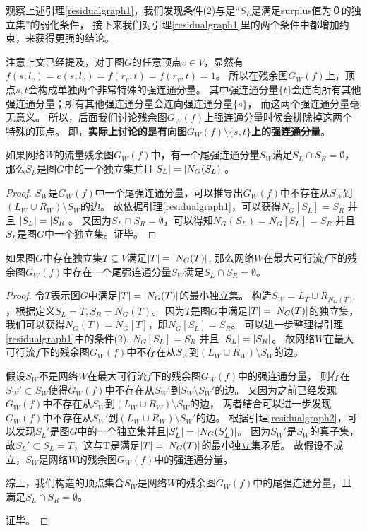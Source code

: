 观察上述引理\ref{residualgraph1}，我们发现条件(2)与是“$S_L$是满足surplus值为０的独立集”的弱化条件，
接下来我们对引理\ref{residualgraph1}里的两个条件中都增加约束，来获得更强的结论。

注意上文已经提及，对于图$G$的任意顶点$v \in V$，显然有$f(s, l_v) = c(s, l_v) = f(r_v, t) = f(r_v, t) = 1$。
所以在残余图$G_W(f)$上，顶点$s,t$会构成单独两个非常特殊的强连通分量。
其中强连通分量$\{t\}$会连向所有其他强连通分量；所有其他强连通分量会连向强连通分量$\{s\}$，
而这两个强连通分量毫无意义。
所以，后面我们讨论残余图$G_W(f)$上强连通分量时候会排除掉这两个特殊的顶点。
即，\textbf{实际上讨论的是有向图$G_W(f) \setminus \{s, t\}$上的强连通分量}。


\begin{lemma}  \label{residualgraph2}
如果网络$W$的流量残余图$G_W(f)$中，有一个尾强连通分量$S_W$满足$S_L \cap S_R = \emptyset$，
那么$S_L$是图$G$中的一个独立集并且$\left\vert S_L \right\vert = \left\vert N_G(S_L) \right\vert$。
\end{lemma}
\begin{proof}
$S_W$是$G_W(f)$中一个尾强连通分量，可以推导出$G_W(f)$中不存在从$S_W$到$(L_W \cup R_W) \setminus S_W$的边。
故依据引理\ref{residualgraph1}，可以获得$N_G[S_L] = S_R$ 并且 $\left\vert S_L \right\vert = \left\vert S_R \right\vert$。
又因为$S_L \cap S_R = \emptyset$，可以得知$N_G(S_L) = N_G[S_L] = S_R$ 并且 $S_L$是图$G$中一个独立集。证毕。
\end{proof}

\begin{lemma}  \label{residualgraph3}
如果图$G$中存在独立集$T \subseteq V$满足$\left\vert T \right\vert = \left\vert N_G(T) \right\vert$,
那么网络$W$在最大可行流$f$下的残余图$G_W(f)$中存在一个尾强连通分量$S_W$满足$S_L \cap S_R = \emptyset$。
\end{lemma}
\begin{proof}
令$T$表示图$G$中满足$\left\vert T \right\vert = \left\vert N_G(T) \right\vert$的最小独立集。
构造$S_W = L_T \cup R_{N_G(T)}$，根据定义$S_L = T, S_R = N_G(T)$。
因为$T$是图$G$中满足$\left\vert T \right\vert = \left\vert N_G(T) \right\vert$的独立集，
我们可以获得$N_G(T) = N_G[T]$，即$N_G[S_L] = S_R$。
可以进一步整理得引理\ref{residualgraph1}中的条件(2), $N_G[S_L] = S_R$ 并且 $\left\vert S_L \right\vert = \left\vert S_R \right\vert$。
故网络$W$在最大可行流$f$下的残余图$G_W(f)$中不存在从$S_W$到$(L_W \cup R_W) \setminus S_W$的边。

假设$S_W$不是网络$W$在最大可行流$f$下的残余图$G_W(f)$中的强连通分量，
则存在$S_W' \subset S_W$使得$G_W(f)$中不存在从$S_W'$到$S_W \setminus S_W'$的边。
又因为之前已经发现$G_W(f)$中不存在从$S_W$到$(L_W \cup R_W) \setminus S_W$的边，
两者结合可以进一步发现$G_W(f)$中不存在从$S_W'$到$(L_W \cup R_W) \setminus S_W'$的边。
根据引理\ref{residualgraph2}，可以发现$S_L'$是图$G$中的一个独立集并且$\left\vert S_L' \right\vert = \left\vert N_G(S_L') \right\vert$。
因为$S_W'$是$S_W$的真子集，故$S_L' \subset S_L = T$，这与T是满足$\left\vert T \right\vert = \left\vert N_G(T) \right\vert$的最小独立集矛盾。
故假设不成立，$S_W$是网络$W$的残余图$G_W(f)$中的强连通分量。

综上，我们构造的顶点集合$S_W$是网络$W$的残余图$G_W(f)$中的尾强连通分量，且满足$S_L \cap S_R = \emptyset$。

证毕。
\end{proof}

